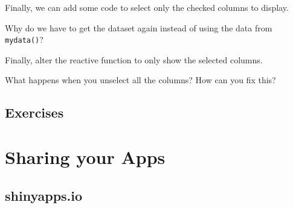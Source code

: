\documentclass[
]{book}
\newenvironment{Shaded}{\begin{snugshade}}{\end{snugshade}}
\newcommand{\AttributeTok}[1]{\textcolor[rgb]{0.77,0.63,0.00}{#1}}
\newcommand{\ConstantTok}[1]{\textcolor[rgb]{0.00,0.00,0.00}{#1}}
\newcommand{\FunctionTok}[1]{\textcolor[rgb]{0.00,0.00,0.00}{#1}}
\newcommand{\NormalTok}[1]{#1}
\newcommand{\OtherTok}[1]{\textcolor[rgb]{0.56,0.35,0.01}{#1}}
\newcommand{\SpecialCharTok}[1]{\textcolor[rgb]{0.00,0.00,0.00}{#1}}
\newcommand{\StringTok}[1]{\textcolor[rgb]{0.31,0.60,0.02}{#1}}
\begin{document}
Finally, we can add some code to select only the checked columns to display.

\begin{Shaded}
\end{Shaded}

Why do we have to get the dataset again instead of using the data from \texttt{mydata()}?

Finally, alter the reactive function to only show the selected columns.

\begin{Shaded}
\end{Shaded}

What happens when you unselect all the columns? How can you fix this?

\hypertarget{exercises-contingency}{%
\section{Exercises}\label{exercises-contingency}}

\hypertarget{sharing}{%
\chapter{Sharing your Apps}\label{sharing}}

\hypertarget{shinyapps.io}{%
\section{shinyapps.io}\label{shinyapps.io}}
\end{document}
